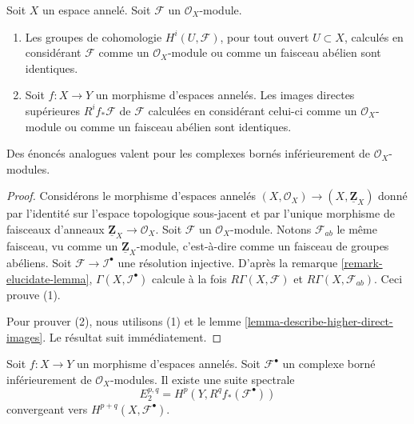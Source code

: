 \begin{lemma}

\label{lemma-modules-abelian}

Soit $X$ un espace annelé. Soit $\mathcal{F}$ un $\mathcal{O}_X$-module.

\begin{enumerate}

\item Les groupes de cohomologie $H^i(U, \mathcal{F})$, pour tout ouvert $U \subset X$, calculés en considérant $\mathcal{F}$ comme un $\mathcal{O}_X$-module ou comme un faisceau abélien sont identiques.
\item Soit $f : X \to Y$ un morphisme d'espaces annelés. Les images directes supérieures $R^if_*\mathcal{F}$ de $\mathcal{F}$
calculées en considérant celui-ci comme un $\mathcal{O}_X$-module ou comme un faisceau abélien sont identiques.

\end{enumerate}

Des énoncés analogues valent pour les complexes bornés inférieurement de $\mathcal{O}_X$-modules.

\end{lemma}

\begin{proof}
Considérons le morphisme d'espaces annelés $(X, \mathcal{O}_X) \to (X, \underline{\mathbf{Z}}_X)$ donné par l'identité sur l'espace topologique sous-jacent et par l'unique morphisme de faisceaux d'anneaux $\underline{\mathbf{Z}}_X \to \mathcal{O}_X$. Soit $\mathcal{F}$ un $\mathcal{O}_X$-module. Notons $\mathcal{F}_{ab}$ le même faisceau, vu comme un $\underline{\mathbf{Z}}_X$-module, c'est-à-dire comme un faisceau de groupes abéliens. Soit $\mathcal{F} \to \mathcal{I}^\bullet$ une résolution injective. D'après la remarque \ref{remark-elucidate-lemma}, $\Gamma(X, \mathcal{I}^\bullet)$ calcule à la fois $R\Gamma(X, \mathcal{F})$ et $R\Gamma(X, \mathcal{F}_{ab})$. Ceci prouve (1).

\medskip\noindent

Pour prouver (2), nous utilisons (1) et le lemme \ref{lemma-describe-higher-direct-images}. Le résultat suit immédiatement.

\end{proof}

\begin{lemma}
\label{lemma-Leray}
Soit $f : X \to Y$ un morphisme d'espaces annelés. Soit $\mathcal{F}^\bullet$ un complexe borné inférieurement de $\mathcal{O}_X$-modules. Il existe une suite spectrale $$
E_2^{p, q} = H^p(Y, R^qf_*(\mathcal{F}^\bullet))
$$ convergeant vers $H^{p + q}(X, \mathcal{F}^\bullet)$.
\end{lemma}

